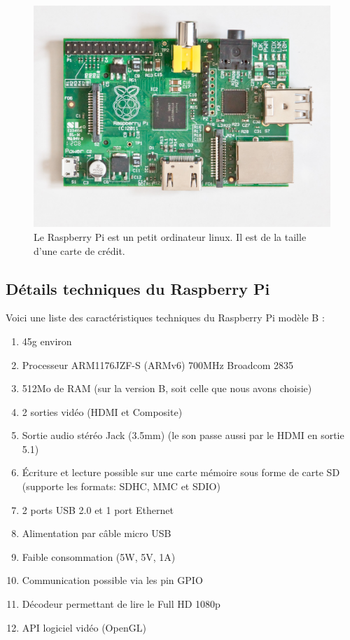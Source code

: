 \documentclass[a4paper,11pt]{report}
\begin{document}
{\begin{figure}[h]
\includegraphics[width = 1.0\textwidth]{raspberrypi.jpg}
\caption[Raspberry Pi]{\label{RaspberryPi} Le Raspberry Pi est un petit ordinateur linux. Il est de la taille d'une carte de crédit.}
\end{figure}

\subsection{Détails techniques du Raspberry Pi}
Voici une liste des caractéristiques techniques du Raspberry Pi modèle B \cite{RaspberryPiCaracteristiques}:
\begin{enumerate}
\item 45g environ
\item Processeur ARM1176JZF-S (ARMv6) 700MHz Broadcom 2835
\item 512Mo de RAM (sur la version B, soit celle que nous avons choisie)
\item 2 sorties vidéo (HDMI et Composite) 
\item Sortie audio stéréo Jack (3.5mm) (le son passe aussi par le HDMI en sortie 5.1)
\item Écriture et lecture possible sur une carte mémoire sous forme de carte SD (supporte les formats: SDHC, MMC et SDIO)
\item 2 ports USB 2.0 et 1 port Ethernet
\item Alimentation par câble micro USB
\item Faible consommation (5W, 5V, 1A)
\item Communication possible via les pin GPIO
\item Décodeur permettant de lire le Full HD  1080p
\item API logiciel vidéo (OpenGL)
\end{enumerate}

}
\end{document}
